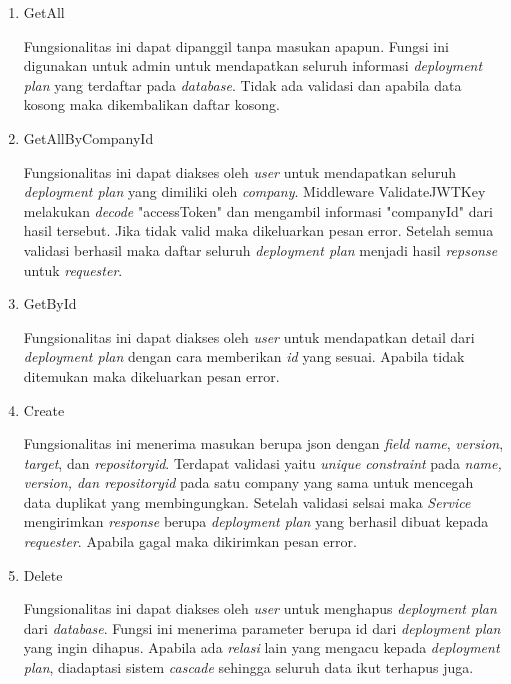 \begin{enumerate}
    \item GetAll

          Fungsionalitas ini dapat dipanggil tanpa masukan apapun. Fungsi ini digunakan untuk admin untuk mendapatkan seluruh informasi \textit{deployment plan} yang terdaftar pada \textit{database}. Tidak ada validasi dan apabila data kosong maka dikembalikan daftar kosong.

    \item GetAllByCompanyId

          Fungsionalitas ini dapat diakses oleh \textit{user} untuk mendapatkan seluruh \textit{deployment plan} yang dimiliki oleh \textit{company}. Middleware ValidateJWTKey melakukan \textit{decode} "accessToken" dan mengambil informasi "companyId" dari hasil tersebut. Jika tidak valid maka dikeluarkan pesan error. Setelah semua validasi berhasil maka daftar seluruh \textit{deployment plan} menjadi hasil \textit{repsonse} untuk \textit{requester}.

    \item GetById

          Fungsionalitas ini dapat diakses oleh \textit{user} untuk mendapatkan detail dari \textit{deployment plan} dengan cara memberikan \textit{id} yang sesuai. Apabila tidak ditemukan maka dikeluarkan pesan error.

    \item Create

          Fungsionalitas ini menerima masukan berupa json dengan \textit{field} \textit{name}, \textit{version}, \textit{target}, dan \textit{repository\textunderscore id}. Terdapat validasi yaitu \textit{unique constraint} pada \textit{name, version, dan repository\textunderscore id} pada satu company yang sama untuk mencegah data duplikat yang membingungkan. Setelah validasi selsai maka \textit{Service} mengirimkan \textit{response} berupa \textit{deployment plan} yang berhasil dibuat kepada \textit{requester}. Apabila gagal maka dikirimkan pesan error.

    \item Delete

          Fungsionalitas ini dapat diakses oleh \textit{user} untuk menghapus \textit{deployment plan} dari \textit{database}. Fungsi ini menerima parameter berupa id dari \textit{deployment plan} yang ingin dihapus. Apabila ada \textit{relasi} lain yang mengacu kepada \textit{deployment plan}, diadaptasi sistem \textit{cascade} sehingga seluruh data ikut terhapus juga.


\end{enumerate}
